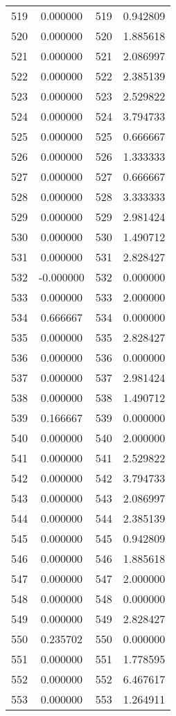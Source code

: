 \documentclass[12pt]{article}
\begin{document}
\begin{longtable}{@{}cccc@{}}
519 & 0.000000 & 519 & 0.942809 \\
520 & 0.000000 & 520 & 1.885618 \\
521 & 0.000000 & 521 & 2.086997 \\
522 & 0.000000 & 522 & 2.385139 \\
523 & 0.000000 & 523 & 2.529822 \\
524 & 0.000000 & 524 & 3.794733 \\
525 & 0.000000 & 525 & 0.666667 \\
526 & 0.000000 & 526 & 1.333333 \\
527 & 0.000000 & 527 & 0.666667 \\
528 & 0.000000 & 528 & 3.333333 \\
529 & 0.000000 & 529 & 2.981424 \\
530 & 0.000000 & 530 & 1.490712 \\
531 & 0.000000 & 531 & 2.828427 \\
532 & -0.000000 & 532 & 0.000000 \\
533 & 0.000000 & 533 & 2.000000 \\
534 & 0.666667 & 534 & 0.000000 \\
535 & 0.000000 & 535 & 2.828427 \\
536 & 0.000000 & 536 & 0.000000 \\
537 & 0.000000 & 537 & 2.981424 \\
538 & 0.000000 & 538 & 1.490712 \\
539 & 0.166667 & 539 & 0.000000 \\
540 & 0.000000 & 540 & 2.000000 \\
541 & 0.000000 & 541 & 2.529822 \\
542 & 0.000000 & 542 & 3.794733 \\
543 & 0.000000 & 543 & 2.086997 \\
544 & 0.000000 & 544 & 2.385139 \\
545 & 0.000000 & 545 & 0.942809 \\
546 & 0.000000 & 546 & 1.885618 \\
547 & 0.000000 & 547 & 2.000000 \\
548 & 0.000000 & 548 & 0.000000 \\
549 & 0.000000 & 549 & 2.828427 \\
550 & 0.235702 & 550 & 0.000000 \\
551 & 0.000000 & 551 & 1.778595 \\
552 & 0.000000 & 552 & 6.467617 \\
553 & 0.000000 & 553 & 1.264911 \\

\end{longtable}
\end{document}
